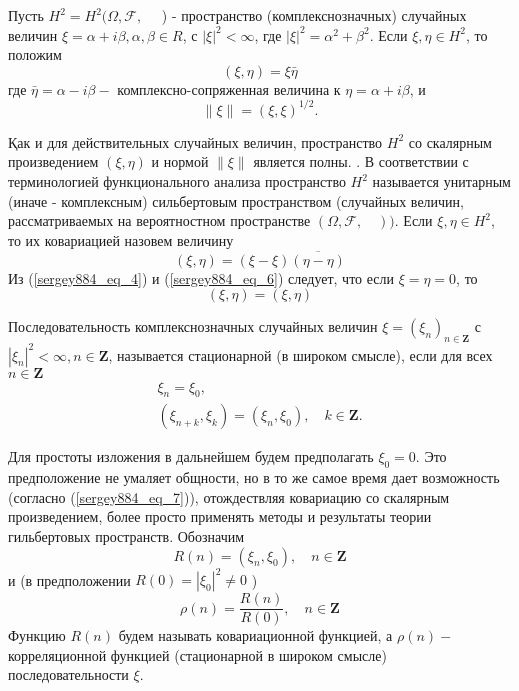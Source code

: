 Пусть $H^2=H^2(\Omega, \mathscr{F}, \quad$ ) - пространство (комплекснозначных) случайных величин $\xi=\alpha+i \beta, \alpha, \beta \in R$, с $|\xi|^2<\infty$, где $|\xi|^2=\alpha^2+\beta^2$. Если $\xi, \eta \in H^2$, то положим
\begin{equation}\label{sergey884_eq_4}
(\xi, \eta)=\xi \bar{\eta}
\end{equation}
где $\bar{\eta}=\alpha-i \beta-$ комплексно-сопряженная величина к $\eta=\alpha+i \beta$, и
\begin{equation}\label{sergey884_eq_5}
\parallel \xi\parallel =(\xi, \xi)^{1 / 2} .
\end{equation}
\newpage

Қак и для действительных случайных величин, пространство $H^2$  со скалярным произведением $(\xi, \eta)$ и нормой $\parallel \xi\parallel $ является полны. . В соответствии с терминологией функционального анализа пространство $H^2$ называется унитарным (иначе - комплексным) сильбертовым пространством (случайных величин, рассматриваемых на вероятностном пространстве $(\Omega, \mathscr{F}, \quad))$.
Если $\xi, \eta \in H^2$, то их ковариацией назовем величину
\begin{equation}\label{sergey884_eq_6}
(\xi, \eta)=(\xi-\xi) \overline{(\eta-\eta)}
\end{equation}
Из (\ref{sergey884_eq_4}) и (\ref{sergey884_eq_6}) следует, что если $\xi=\eta=0$, то
\begin{equation}\label{sergey884_eq_7}
(\xi, \eta)=(\xi, \eta)
\end{equation}
\begin{definition} Последовательность комплекснозначных случайных величин $\xi=\left(\xi_n\right)_{n \in \mathbf{Z}}$ с $\left|\xi_n\right|^2<\infty, n \in \mathbf{Z}$, называется стационарной (в широком смысле), если для всех $n \in \mathbf{Z}$
\begin{equation}\label{sergey884_eq_8}
\begin{gathered}
\xi_n=\xi_0, \\
\left(\xi_{n+k}, \xi_k\right)=\left(\xi_n, \xi_0\right), \quad k \in \mathbf{Z} .
\end{gathered}
\end{equation}
\end{definition}
Для простоты изложения в дальнейшем будем предполагать $\xi_0=0$. Это предположение не умаляет общности, но в то же самое время дает возможность (согласно (\ref{sergey884_eq_7})), отождествляя ковариацию со скалярным произведением, более просто применять методы и результаты теории гильбертовых пространств.
Обозначим
\begin{equation}\label{sergey884_eq_9}
R(n)=\left(\xi_n, \xi_0\right), \quad n \in \mathbf{Z}
\end{equation}
и (в предположении $R(0)=\left|\xi_0\right|^2 \neq 0$ )
\begin{equation}\label{sergey884_eq_10}
\rho(n)=\frac{R(n)}{R(0)}, \quad n \in \mathbf{Z}
\end{equation}
Функцию $R(n)$ будем называть ковариационной функцией, а $\rho(n)-$ корреляционной функцией (стационарной в широком смысле) последовательности $\xi$.

